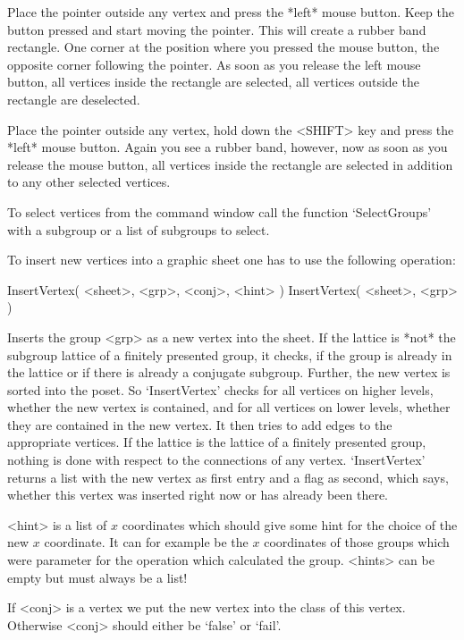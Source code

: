 Place the pointer  outside any vertex  and press the *left* mouse button.
Keep the button pressed and start moving the pointer.  This will create a
rubber band rectangle.  One corner at the position  where you pressed the
mouse button, the opposite corner following  the pointer.  As soon as you
release the left mouse button,   all  vertices inside the rectangle   are
selected, all vertices outside the rectangle are deselected.

Place the pointer outside any vertex, hold down the <SHIFT> key and press
the *left*  mouse button.  Again  you see a rubber  band, however, now as
soon as you release  the mouse button,  all vertices inside the rectangle
are selected in addition to any other selected vertices.

To select vertices from the {\GAP} command window call the function
`SelectGroups' with a subgroup or a list of subgroups to select.



To insert new vertices into a graphic sheet one has to use the
following operation:

\>InsertVertex( <sheet>, <grp>, <conj>, <hint> )
\>InsertVertex( <sheet>, <grp> )

Inserts the group <grp> as a new vertex into the sheet. If the lattice
is *not*  the   subgroup lattice  of a  finitely  presented  group, it
checks, if the group is already in the lattice  or if there is already
a conjugate  subgroup.  Further,  the new  vertex is  sorted into  the
poset. So  `InsertVertex'  checks for  all vertices  on higher levels,
whether the new vertex  is contained,  and  for all vertices on  lower
levels, whether they are contained in the new vertex. It then tries to
add edges to the appropriate vertices.  If  the lattice is the lattice
of a  finitely presented group,  nothing is  done with respect  to the
connections of any vertex.  `InsertVertex' returns a list with the new
vertex as first entry and  a flag as  second, which says, whether this
vertex was inserted right now or has already  been there.  

<hint> is a list of $x$ coordinates which should give some hint for
the choice of the new $x$ coordinate. It can for example be the $x$
coordinates of those groups which were parameter for the operation
which calculated the group. <hints> can be empty but must always be a
list!

If <conj> is a vertex we put the new vertex into the class of this
vertex.  Otherwise <conj> should either be `false' or `fail'.


